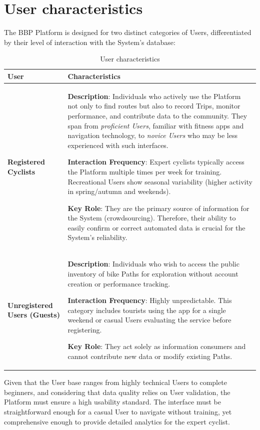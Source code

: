 \section{User characteristics}
The BBP Platform is designed for two distinct categories of Users, differentiated by their level of interaction with the System's database:

\begin{table}[H]
    \sf
    \small
    \centering
    \renewcommand{\arraystretch}{1.5}
    \begin{tabularx}{\textwidth}{|l|X|}
        \hline
        \rowcolor{lightgray} \textbf{User} & \textbf{Characteristics} \\
        \hline
        \textbf{Registered Cyclists} &
        \textbf{Description}: Individuals who actively use the Platform not only to find routes but also to record Trips, monitor performance, and contribute data to the community.
        They span from \emph{proficient Users}, familiar with fitness apps and navigation technology, to \emph{novice Users} who may be less experienced with such interfaces.

        \textbf{Interaction Frequency}: Expert cyclists typically access the Platform multiple times per week for training. Recreational Users show seasonal variability (higher activity in spring/autumn and weekends).
        
        \textbf{Key Role}: They are the primary source of information for the System (crowdsourcing). Therefore, their ability to easily confirm or correct automated data is crucial for the System's reliability. \\
        \hline
        \textbf{Unregistered Users (Guests)} &
        \textbf{Description}: Individuals who wish to access the public inventory of bike Paths for exploration without account creation or performance tracking.

        \textbf{Interaction Frequency}: Highly unpredictable. This category includes tourists using the app for a single weekend or casual Users evaluating the service before registering.

        \textbf{Key Role}: They act solely as information consumers and cannot contribute new data or modify existing Paths. \\
        \hline
    \end{tabularx}
    \caption{User characteristics}
\end{table}

Given that the User base ranges from highly technical Users to complete beginners, and considering that data quality relies on User validation, the Platform must ensure a high usability standard. The interface must be straightforward enough for a casual User to navigate without training, yet comprehensive enough to provide detailed analytics for the expert cyclist.

